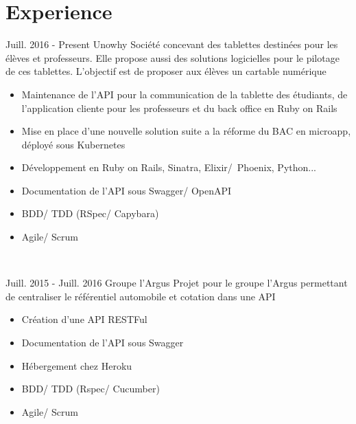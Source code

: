 \documentclass[letterpaper]{twentysecondcv} %
\begin{document}
\makeprofile %


\section{Experience}
\large

\begin{twenty} %
\twentyitem
    	{Juill. 2016 - }
		{Present}
        {Unowhy}
        {}
        {Société concevant des tablettes destinées pour les élèves et professeurs. Elle propose aussi des solutions logicielles pour le pilotage de ces tablettes. L'objectif est de proposer aux élèves un cartable numérique}
        {\begin{itemize}
        \item Maintenance de l'API pour la communication de la tablette des étudiants, de l'application cliente pour les professeurs et du back office en Ruby on Rails
        \item Mise en place d'une nouvelle solution suite a la réforme du BAC en microapp, déployé sous Kubernetes
        \item Développement en Ruby on Rails, Sinatra, \mbox{Elixir/ Phoenix}, Python...
        \item Documentation de l'API sous Swagger/ OpenAPI
        \item BDD/ TDD (RSpec/ Capybara)
        \item Agile/ Scrum
        
        \end{itemize}}
        \\
\end{twenty}

\begin{twenty}
	\twentyitem
    	{Juill. 2015 - }
		{Juill. 2016}
        {Groupe l'Argus}
        {}
        {Projet pour le groupe l'Argus permettant de centraliser le référentiel automobile et cotation dans une API}
        {
        {\begin{itemize}
        \item Création d'une API RESTFul
        \item Documentation de l'API sous Swagger
        \item Hébergement chez Heroku
        \item BDD/ TDD (Rspec/ Cucumber) 
        \item Agile/ Scrum

    \end{itemize}}
        }
    \\   

\end{twenty}
\end{document}
